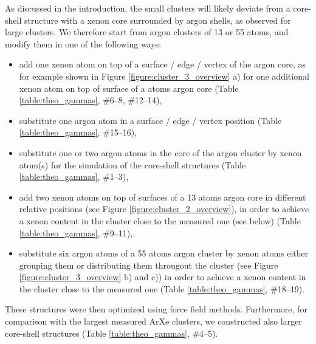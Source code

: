 As discussed in the introduction, the small clusters will likely
deviate from a core-shell structure with a xenon core surrounded
by argon shells, as observed for large clusters.\cite{tchaplyguinearxe,Vach_1999} We therefore start from
argon clusters of 13 or 55 atoms, and modify them in one of the following
ways:
%
\begin{itemize}
 \item add one xenon atom on top of a surface / edge / vertex of
       the argon core, as for example shown in
       Figure \ref{figure:cluster_3_overview} a)
       for one additional xenon atom
       on top of surface of a \unit[55]{atoms} argon core
       (Table \ref{table:theo_gammas}, \#6--8, \#12--14),
 \item substitute one argon atom in a surface / edge / vertex position
       (Table \ref{table:theo_gammas}, \#15--16),
 \item substitute one or two argon atoms in the core of the argon cluster
       by xenon atom(s) for the simulation of the core-shell structures
       (Table \ref{table:theo_gammas}, \#1--3),
 \item add two xenon atoms on top of surfaces of a 13 atoms argon core
       in different relative positions (see Figure
       \ref{figure:cluster_2_overview}),
       in order to achieve a xenon content in the cluster close to the
       measured one (see below)
       (Table \ref{table:theo_gammas}, \#9--11),
 \item substitute six argon atoms of a 55 atoms argon cluster by xenon
       atoms either grouping them or distributing them througout the cluster
       (see Figure \ref{figure:cluster_3_overview} b) and c)) in order to
       achieve a xenon content in the cluster close to the measured one
       (Table \ref{table:theo_gammas}, \#18--19).
\end{itemize}

These structures were then optimized using force field methods.
%
Furthermore, for comparison with the largest measured ArXe clusters, we constructed also larger core-shell structures (Table \ref{table:theo_gammas}, \#4--5).
